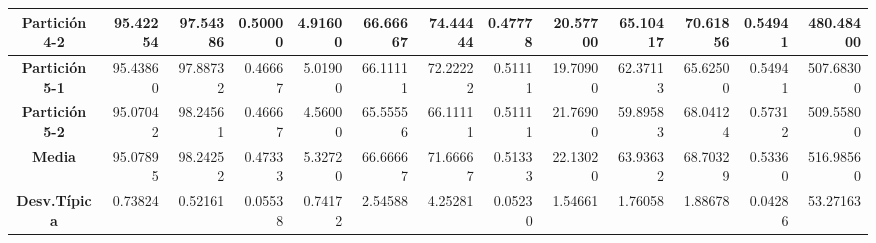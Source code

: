 \documentclass[a4paper,11pt]{article}
\begin{document}
\begin{table}[H]
\begin{adjustbox}{width=1.1\textwidth}
\begin{tabular}{|c|r|r|r|r|r|r|r|r|r|r|r|r|}
  \textbf{Partición 4-2} & 95.42254 & 97.54386 & 0.50000 & 4.91600 & 66.66667 & 74.44444 & 0.47778 & 20.57700 & 65.10417 & 70.61856 & 0.54941 & 480.48400 \\ \hline
  \textbf{Partición 5-1} & 95.43860 & 97.88732 & 0.46667 & 5.01900 & 66.11111 & 72.22222 & 0.51111 & 19.70900 & 62.37113 & 65.62500 & 0.54941 & 507.68300 \\ \hline
  \textbf{Partición 5-2} & 95.07042 & 98.24561 & 0.46667 & 4.56000 & 65.55556 & 66.11111 & 0.51111 & 21.76900 & 59.89583 & 68.04124 & 0.57312 & 509.55800 \\ \hline
  \textbf{Media} & 95.07895 & 98.24252 & 0.47333 & 5.32720 & 66.66667 & 71.66667 & 0.51333 & 22.13020 & 63.93632 & 68.70329 & 0.53360 & 516.98560 \\ \hline
  \textbf{Desv.Típica} & 0.73824 & 0.52161 & 0.05538 & 0.74172 & 2.54588 & 4.25281 & 0.05230 & 1.54661 & 1.76058 & 1.88678 & 0.04286 & 53.27163 \\ \hline
  \end{tabular}
  \end{adjustbox}
  \label{BMB}
  \end{table}
\end{document}
